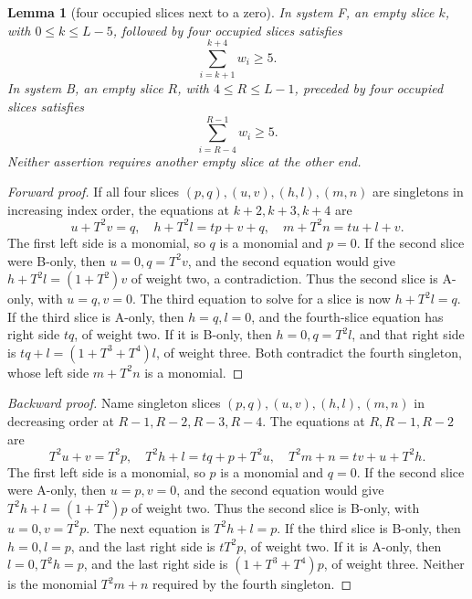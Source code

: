 \documentclass{article}
\newtheorem{lemma}{Lemma}
\begin{document}
\begin{lemma}[four occupied slices next to a zero]\label{lem:four}
  In system F, an empty slice \(k\), with \(0 \le k \le L-5\), followed by four occupied slices
  satisfies
  \begin{equation}
    \sum_{i=k+1}^{k+4} w_i \ge 5.
  \end{equation}
  In system B, an empty slice \(R\), with \(4 \le R \le L-1\), preceded by four occupied slices
  satisfies
  \begin{equation}
    \sum_{i=R-4}^{R-1} w_i \ge 5.
  \end{equation}
  Neither assertion requires another empty slice at the other end.
\end{lemma}

\begin{proof}[Forward proof]
  If all four slices \((p,q), (u,v), (h,l), (m,n)\) are singletons in increasing index order, the
  equations at \(k + 2, k + 3, k + 4\) are
  \begin{equation}
    u + T^2 v = q, \quad h + T^2 l = tp + v + q, \quad m + T^2 n = tu + l + v.
  \end{equation}
  The first left side is a monomial, so \(q\) is a monomial and \(p = 0\). If the second slice
  were B-only, then \(u = 0, q = T^2 v\), and the second equation would give
  \(h + T^2 l = (1 + T^2)v\) of weight two, a contradiction. Thus the second slice is A-only, with
  \(u = q, v = 0\). The third equation to solve for a slice is now \(h + T^2 l = q\). If the third
  slice is A-only, then \(h = q, l = 0\), and the fourth-slice equation has right side \(tq\), of
  weight two. If it is B-only, then \(h = 0, q = T^2 l\), and that right side is
  \(tq + l = (1 + T^3 + T^4)l\), of weight three. Both contradict the fourth singleton, whose left
  side \(m + T^2 n\) is a monomial.
\end{proof}

\begin{proof}[Backward proof]
  Name singleton slices \((p,q), (u,v), (h,l), (m,n)\) in decreasing order at
  \(R - 1, R - 2, R - 3, R - 4\). The equations at \(R, R - 1, R - 2\) are
  \begin{equation}
    T^2 u + v = T^2 p, \quad T^2 h + l = tq + p + T^2 u, \quad T^2 m + n = tv + u + T^2 h.
  \end{equation}
  The first left side is a monomial, so \(p\) is a monomial and \(q = 0\). If the second slice
  were A-only, then \(u = p, v = 0\), and the second equation would give
  \(T^2 h + l = (1 + T^2)p\) of weight two. Thus the second slice is B-only, with
  \(u = 0, v = T^2 p\). The next equation is \(T^2 h + l = p\). If the third slice is B-only, then
  \(h = 0, l = p\), and the last right side is \(t T^2 p\), of weight two. If it is A-only, then
  \(l = 0, T^2 h = p\), and the last right side is \((1 + T^3 + T^4)p\), of weight three. Neither
  is the monomial \(T^2 m + n\) required by the fourth singleton.
\end{proof}
\end{document}
